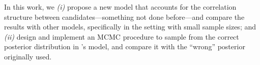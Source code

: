 \documentclass[11pt]{article}
\begin{document}
In this work, we \textit{(i)} propose a new model that accounts for the correlation structure between candidates---something not done before---and compare the results with other models, specifically in the setting with small sample sizes; and \textit{(ii)} design and implement an MCMC procedure to sample from the correct posterior distribution in \citet{diluvi2018}'s model, and compare it with the ``wrong'' posterior originally used.




\small
\printbibliography
\end{document}
